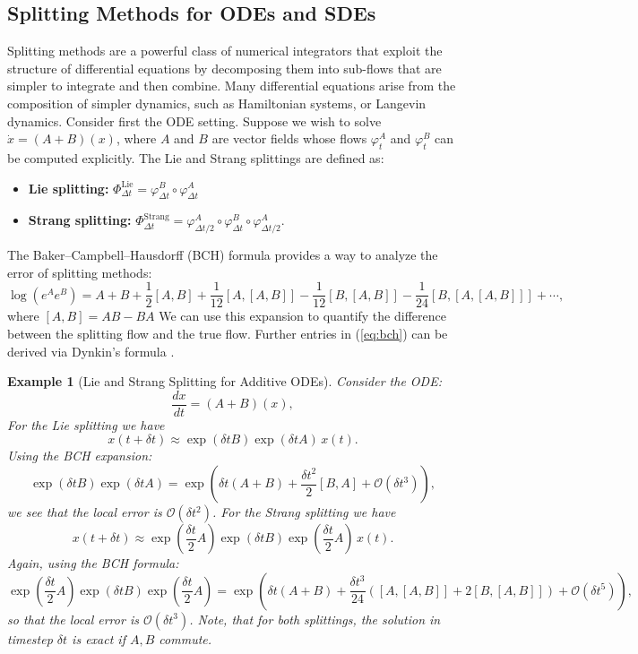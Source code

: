 \documentclass[11pt, twoside]{report}
\newtheorem{example}[theorem]{Example}
\begin{document}
\subsection{Splitting Methods for ODEs and SDEs}\label{sec:splitting_methods}

Splitting methods are a powerful class of numerical integrators that exploit the structure of differential equations by decomposing them into sub-flows that are simpler to integrate and then combine. Many differential equations arise from the composition of simpler dynamics, such as Hamiltonian systems, or Langevin dynamics. Consider first the ODE setting. Suppose we wish to solve $\dot{x} = (A + B)(x)$, where $A$ and $B$ are vector fields whose flows $\varphi^A_t$ and $\varphi^B_t$ can be computed explicitly. The Lie and Strang splittings are defined as:

\begin{itemize}
    \item \textbf{Lie splitting:} $\Phi_{\Delta t}^{\mathrm{Lie}} = \varphi^B_{\Delta t} \circ \varphi^A_{\Delta t}$
    \item \textbf{Strang splitting:} $\Phi_{\Delta t}^{\mathrm{Strang}} = \varphi^A_{\Delta t/2} \circ \varphi^B_{\Delta t} \circ \varphi^A_{\Delta t/2}$.
\end{itemize}
The Baker–Campbell–Hausdorff (BCH) formula provides a way to analyze the error of splitting methods:
\begin{equation} \label{eq:bch}
    \log \left(e^A e^B\right)=A+B+\frac{1}{2}[A, B]+\frac{1}{12}[A,[A, B]]-\frac{1}{12}[B,[A, B]]-\frac{1}{24}[B,[A,[A, B]]] + \cdots,
\end{equation}
where $[A,B] = AB-BA$
We can use this expansion to quantify the difference between the splitting flow and the true flow. Further entries in (\ref{eq:bch}) can be derived via Dynkin's formula \cite{dynkin1947}.
\begin{example}[Lie and Strang Splitting for Additive ODEs]
Consider the ODE:
\[
\frac{dx}{dt} = (A + B)(x),
\]
For the Lie splitting we have
\[
x(t+\delta t) \approx \exp(\delta t B)\exp(\delta t A)\, x(t).
\]
Using the BCH expansion:
\[
\exp(\delta t B)\exp(\delta t A) = \exp\left( \delta t (A + B) + \frac{\delta t^2}{2}[B, A] + \mathcal{O}(\delta t^3) \right),
\]
we see that the local error is $\mathcal{O}(\delta t^2)$. For the Strang splitting we have
\[
x(t+\delta t) \approx \exp\left( \frac{\delta t}{2} A \right)\exp(\delta t B)\exp\left( \frac{\delta t}{2} A \right)\, x(t).
\]
Again, using the BCH formula:
\[
\exp\left( \frac{\delta t}{2} A \right)\exp(\delta t B)\exp\left( \frac{\delta t}{2} A \right)
= \exp\left( \delta t(A + B) + \frac{\delta t^3}{24} \left( [A, [A, B]] + 2[B, [A, B]] \right) + \mathcal{O}(\delta t^5) \right),
\]
so that the local error is $\mathcal{O}(\delta t^3)$. Note, that for both splittings, the solution in timestep $\delta t$ is exact if $A,B$ commute.
\end{example}
\end{document}

